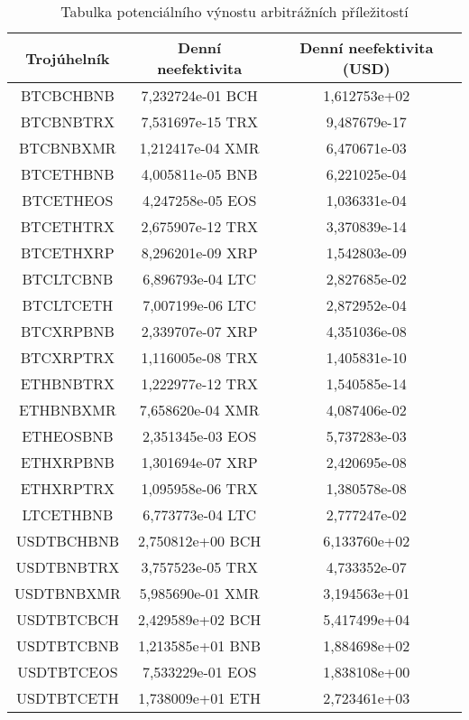 \begin{table}\centering
\caption{Tabulka potenciálního výnostu arbitrážních příležitostí}
\label{table_gains}
\begin{tabular}{|| c | c | c ||}\hline Trojúhelník & Denní neefektivita & Denní neefektivita (USD)\\ [0.5ex]
 \hline\hline BTCBCHBNB & 7,232724e-01 BCH & 1,612753e+02\\ 
 \hline BTCBNBTRX & 7,531697e-15 TRX & 9,487679e-17\\ 
 \hline BTCBNBXMR & 1,212417e-04 XMR & 6,470671e-03\\ 
 \hline BTCETHBNB & 4,005811e-05 BNB & 6,221025e-04\\ 
 \hline BTCETHEOS & 4,247258e-05 EOS & 1,036331e-04\\ 
 \hline BTCETHTRX & 2,675907e-12 TRX & 3,370839e-14\\ 
 \hline BTCETHXRP & 8,296201e-09 XRP & 1,542803e-09\\ 
 \hline BTCLTCBNB & 6,896793e-04 LTC & 2,827685e-02\\ 
 \hline BTCLTCETH & 7,007199e-06 LTC & 2,872952e-04\\ 
 \hline BTCXRPBNB & 2,339707e-07 XRP & 4,351036e-08\\ 
 \hline BTCXRPTRX & 1,116005e-08 TRX & 1,405831e-10\\ 
 \hline ETHBNBTRX & 1,222977e-12 TRX & 1,540585e-14\\ 
 \hline ETHBNBXMR & 7,658620e-04 XMR & 4,087406e-02\\ 
 \hline ETHEOSBNB & 2,351345e-03 EOS & 5,737283e-03\\ 
 \hline ETHXRPBNB & 1,301694e-07 XRP & 2,420695e-08\\ 
 \hline ETHXRPTRX & 1,095958e-06 TRX & 1,380578e-08\\ 
 \hline LTCETHBNB & 6,773773e-04 LTC & 2,777247e-02\\ 
 \hline USDTBCHBNB & 2,750812e+00 BCH & 6,133760e+02\\ 
 \hline USDTBNBTRX & 3,757523e-05 TRX & 4,733352e-07\\ 
 \hline USDTBNBXMR & 5,985690e-01 XMR & 3,194563e+01\\ 
 \hline USDTBTCBCH & 2,429589e+02 BCH & 5,417499e+04\\ 
 \hline USDTBTCBNB & 1,213585e+01 BNB & 1,884698e+02\\ 
 \hline USDTBTCEOS & 7,533229e-01 EOS & 1,838108e+00\\ 
 \hline USDTBTCETH & 1,738009e+01 ETH & 2,723461e+03\\ 

\end{tabular}
\end{table}
